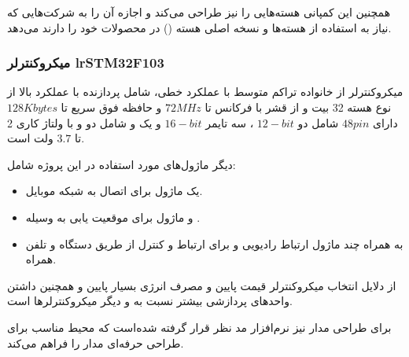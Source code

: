 \documentclass[a4paper,12pt]{report}
\begin{document}
	همچنین این کمپانی هسته‌هایی را نیز طراحی می‌کند و اجازه آن را به شرکت‌هایی که نیاز به استفاده از
	هسته‌ها و  نسخه اصلی هسته
	()
	 در محصولات خود را دارند می‌دهد.

	\subsubsection{
		میکروکنترلر
		lr{STM32F103}}
	میکروکنترلر
	از خانواده تراکم متوسط با عملکرد خطی، شامل پردازنده
	با عملکرد بالا از نوع هسته 32 بیت و از قشر
	با فرکانس تا
	$ 72 MHz $
	و حافظه فوق سریع تا
	$ 128 Kbytes $
	دارای
	$ 48 pin $
	شامل دو
	$ 12-bit $
	، سه تایمر
	$ 16-bit $
	و یک
	و شامل دو
	و
	با ولتاژ کاری 2 تا $ 3.7 $ ولت است.
	\cite{ltc3600:datasheet}

	دیگر ماژول‌های مورد استفاده در این پروژه شامل:
	\begin{itemize}[nosep]
		\item
		یک ماژول
		برای اتصال به شبکه موبایل.
		\item
		و ماژول
		برای موقعیت یابی به وسیله
		.
		\item
		به همراه چند ماژول ارتباط رادیویی و
		برای ارتباط و کنترل از طریق دستگاه
		و تلفن همراه.
	\end{itemize}


	از دلایل انتخاب میکروکنترلر
	قیمت پایین و مصرف انرژی بسیار پایین و همچنین داشتن واحد‌های پردازشی بیشتر نسبت به
	و دیگر میکروکنترلرها است.

	برای طراحی مدار نیز نرم‌افزار
	مد نظر قرار گرفته شده‌است که محیط مناسب برای طراحی حرفه‌ای مدار را فراهم می‌کند.
\end{document}
